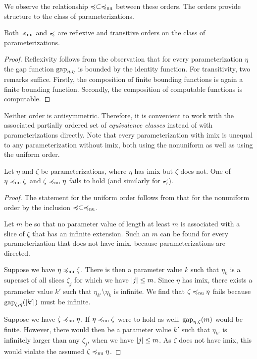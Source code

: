 We observe the relationship $\preccurlyeq \subset \preccurlyeq_\mathrm{nu}$ between these orders.
The orders provide structure to the class of parameterizations.
\begin{lemma}
\label{lem:preorder}%
  Both $\preccurlyeq_\mathrm{nu}$ and $\preccurlyeq$ are reflexive and transitive orders on the class of parameterizations.
\end{lemma}
\begin{proof}
  Reflexivity follows from the observation that for every parameterization $\eta$ the gap function $\operatorname{gap}_{\eta, \eta}$ is bounded by the identity function.
  For transitivity, two remarks suffice.
  Firstly, the composition of finite bounding functions is again a finite bounding function.
  Secondly, the composition of computable functions is computable.
\end{proof}

Neither order is antisymmetric.
Therefore, it is convenient to work with the associated partially ordered set of \emph{equivalence classes} instead of with parameterizations directly.
Note that every parameterization with imix is unequal to any parameterization without imix, both using the nonuniform as well as using the uniform order.

\begin{lemma}
\label{lem:imix}%
  Let $\eta$ and $\zeta$ be parameterizations, where $\eta$ has imix but $\zeta$ does not.
  One of $\eta \preccurlyeq_\mathrm{nu} \zeta$ and $\zeta \preccurlyeq_\mathrm{nu} \eta$ fails to hold (and similarly for $\preccurlyeq$).
\end{lemma}
\begin{proof}
  The statement for the uniform order follows from that for the nonuniform order by the inclusion $\preccurlyeq \subset \preccurlyeq_\mathrm{nu}$.

  Let $m$ be so that no parameter value of length at least $m$ is associated with a slice of $\zeta$ that has an infinite extension.
  Such an $m$ can be found for every parameterization that does not have imix, because parameterizations are directed.

  Suppose we have $\eta \preccurlyeq_\mathrm{nu} \zeta$.
  There is then a parameter value $k$ such that $\eta_k$ is a superset of all slices $\zeta_j$ for which we have ${\lvert j\rvert} \le m$.
  Since $\eta$ has imix, there exists a parameter value $k'$ such that $\eta_{k'} \setminus \eta_k$ is infinite.
  We find that $\zeta \preccurlyeq_\mathrm{nu} \eta$ fails because $\operatorname{gap}_{\zeta, \eta}({\lvert k'\rvert})$ must be infinite.

  Suppose we have $\zeta \preccurlyeq_\mathrm{nu} \eta$.
  If $\eta \preccurlyeq_\mathrm{nu} \zeta$ were to hold as well, $\operatorname{gap}_{\eta, \zeta}(m)$ would be finite.
  However, there would then be a parameter value $k'$ such that $\eta_{k'}$ is infinitely larger than any $\zeta_j$, when we have ${\lvert j\rvert} \le m$.
  As $\zeta$ does not have imix, this would violate the assumed $\zeta \preccurlyeq_\mathrm{nu} \eta$.
\end{proof}

